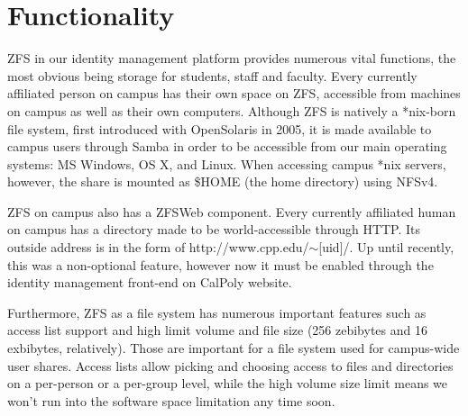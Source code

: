 \section{Functionality}
ZFS in our identity management platform provides numerous vital functions, the most obvious being storage for students, staff and faculty. Every currently affiliated person on campus has their own space on ZFS, accessible from machines on campus as well as their own computers. Although ZFS is natively a *nix-born file system, first introduced with OpenSolaris in 2005, it is made available to campus users through Samba in order to be accessible from our main operating systems: MS Windows, OS X, and Linux. When accessing campus *nix servers, however, the share is mounted as \$HOME (the home directory) using NFSv4. 

ZFS on campus also has a ZFSWeb component. Every currently affiliated human on campus has a directory made to be world-accessible through HTTP. Its outside address is in the form of http://www.cpp.edu/$\sim$[uid]/. Up until recently, this was a non-optional feature, however now it must be enabled through the identity management front-end on CalPoly website.

Furthermore, ZFS as a file system has numerous important features such as access list support and high limit volume and file size (256 zebibytes and 16 exbibytes, relatively). Those are important for a file system used for campus-wide user shares. Access lists allow picking and choosing access to files and directories on a per-person or a per-group level, while the high volume size limit means we won't run into the software space limitation any time soon. 
